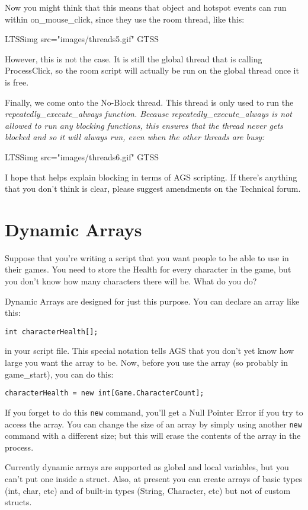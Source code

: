 Now you might think that this means that object and hotspot events can run within
on_mouse_click, since they use the room thread, like this:

LTSSimg src="images/threads5.gif" GTSS

However, this is not the case. It is still the global thread that is calling ProcessClick,
so the room script will actually be run on the global thread once it is free.

Finally, we come onto the No-Block thread. This thread is only used to run the
\it{repeatedly_execute_always} function. Because repeatedly_execute_always is not
allowed to run any blocking functions, this ensures that the thread never gets blocked
and so it will always run, even when the other threads are busy:

LTSSimg src="images/threads6.gif" GTSS

I hope that helps explain blocking in terms of AGS scripting. If there's anything that
you don't think is clear, please suggest amendments on the Technical forum.


\section{Dynamic Arrays}\label{DynamicArrays}%

Suppose that you're writing a script that you want people to be able
to use in their games. You need to store the Health for every character
in the game, but you don't know how many characters there will be. What do you do?

Dynamic Arrays are designed for just this purpose. You can declare an array like this:

\verb$int characterHealth[];$

in your script file. This special notation tells AGS that you don't yet know how large
you want the array to be. Now, before you use the array (so probably in game_start),
you can do this:

\verb$characterHealth = new int[Game.CharacterCount];$

If you forget to do this \verb$new$ command, you'll get a Null Pointer Error if you try
to access the array. You can change the size of an array by simply using another
\verb$new$ command with a different size; but this will erase the contents of the
array in the process.

Currently dynamic arrays are supported as global and local variables, but
you can't put one inside a struct.
Also, at present you can create arrays of basic types (int, char, etc) and
of built-in types (String, Character, etc) but not of custom structs.


